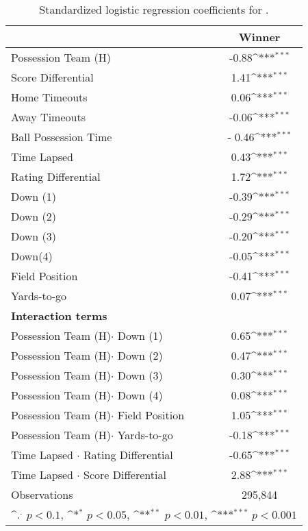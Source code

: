 \documentclass{sig-alternate}
\begin{document}
\begin{table}[ht]
\begin{center}
\def\sym#1{\ifmmode^{#1}\else\(^{#1}\)\fi}
\begin{tabular}{l*{1}{c}}
\toprule
                    &\multicolumn{1}{c}{Winner}\\
\midrule
Possession Team (H)         &      -0.88\sym{***}\\
Score Differential           &      1.41\sym{***}\\
Home Timeouts           &     0.06\sym{***}\\
Away Timeouts           &     -0.06\sym{***}\\
Ball Possession Time  &    - 0.46\sym{***}\\
Time Lapsed       &   0.43\sym{***}\\
Rating Differential         &       1.72\sym{***}\\
Down (1)               &   -0.39\sym{***} \\
Down (2)		& -0.29\sym{***} \\
Down (3) 		& -0.20\sym{***}\\
Down(4)    &	 -0.05\sym{***} \\   
Field Position            &  -0.41\sym{***} \\
Yards-to-go                &  0.07\sym{***}        \\
{\bf Interaction terms} & \\
Possession Team (H)$\cdot$ Down (1) & 0.65\sym{***} \\
Possession Team (H)$\cdot$ Down (2) & 0.47\sym{***} \\
Possession Team (H)$\cdot$ Down (3) & 0.30\sym{***} \\
Possession Team (H)$\cdot$ Down (4) & 0.08\sym{***} \\
Possession Team (H)$\cdot$ Field Position & 1.05\sym{***}\\
Possession Team (H)$\cdot$ Yards-to-go & -0.18\sym{***}\\
Time Lapsed $\cdot$ Rating Differential & -0.65\sym{***}\\
Time Lapsed $\cdot$ Score Differential & 2.88\sym{***}\\
\midrule
Observations        &      295,844         \\
\bottomrule
\multicolumn{2}{l}{\footnotesize \sym{.} \(p<0.1\), \sym{*} \(p<0.05\), \sym{**} \(p<0.01\), \sym{***} \(p<0.001\)}\\
\end{tabular}
\end{center}
\caption{Standardized logistic regression coefficients for {\method}.}
\label{tab:iwinrnfl}
\end{table}
\end{document}
